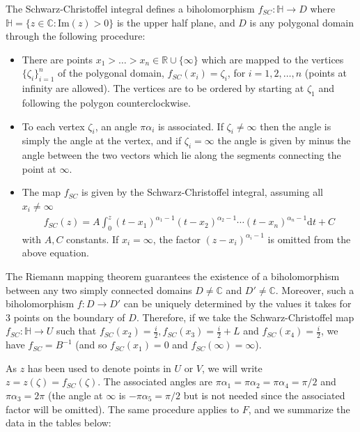 \documentclass[10pt]{article}
\newcommand{\rr}{\mathbb{R}}
\newcommand{\cc}{\mathbb{C}}
\newcommand{\hh}{\mathbb{H}}
\newcommand{\dif}{\mathrm{d}}
\newcommand{\im}[1]{\text{Im}(#1)}
\theoremstyle{plain}
\theoremstyle{definition}
\theoremstyle{plain}
\begin{document}
The Schwarz-Christoffel integral defines a biholomorphism $f_{SC}:\hh\to D$ where $\hh=\{z\in\cc:\im{z}>0\}$ is the upper half plane, and $D$ is any polygonal domain through the following procedure:
\begin{itemize}
	\item There are points $x_1>\dots>x_n\in \rr\cup\{\infty\}$ which are mapped to the vertices $\{\zeta_i\}_{i=1}^n$ of the polygonal domain, $f_{SC}(x_i)=\zeta_i$, for $i=1,2,\dots,n$ (points at infinity are allowed). The vertices are to be ordered by starting at $\zeta_1$ and following the polygon counterclockwise.
	\item To each vertex $\zeta_i$, an angle $\pi\alpha_i$ is associated. If $\zeta_i\neq \infty$ then the angle is simply the angle at the vertex, and if $\zeta_i = \infty$ the angle is given by minus the angle between the two vectors which lie along the segments connecting the point at $\infty$. 
	\item The map $f_{SC}$ is given by the Schwarz-Christoffel integral, assuming all $x_i\neq \infty$
	\begin{align*}
		f_{SC}(z) = A\int_{0}^z (t-x_1)^{\alpha_1-1}(t-x_2)^{\alpha_2-1}\cdots (t-x_n)^{\alpha_n-1} \dif t + C
	\end{align*}
	with $A,C$ constants. If $x_i=\infty$, the factor $(z-x_i)^{\alpha_i-1}$ is omitted from the above equation. 
\end{itemize}
The Riemann mapping theorem guarantees the existence of a biholomorphism between any two simply connected domains $D\neq \cc$ and $D'\neq \cc$. Moreover, such a biholomorphism $f:D\to D'$ can be uniquely determined by the values it takes for 3 points on the boundary of $D$. Therefore, if we take the Schwarz-Christoffel map $f_{SC}:\hh \to U$ such that $f_{SC}(x_2)=\frac{i}{2}, f_{SC}(x_3)=\frac{i}{2}+L$ and $f_{SC}(x_4)=\frac{i}{2}$, we have $f_{SC}=B^{-1}$ (and so $f_{SC}(x_1)=0$ and $f_{SC}(\infty)=\infty$). 

As $z$ has been used to denote points in $U$ or $V$, we will write $z=z(\zeta)=f_{SC}(\zeta)$. The associated angles are $\pi\alpha_1 = \pi\alpha_2 = \pi\alpha_4=\pi/2$ and $\pi\alpha_3=2\pi$ (the angle at $\infty$ is $-\pi\alpha_5=\pi/2$ but is not needed since the associated factor will be omitted). The same procedure applies to $F$, and we summarize the data in the tables below: 
\end{document}
